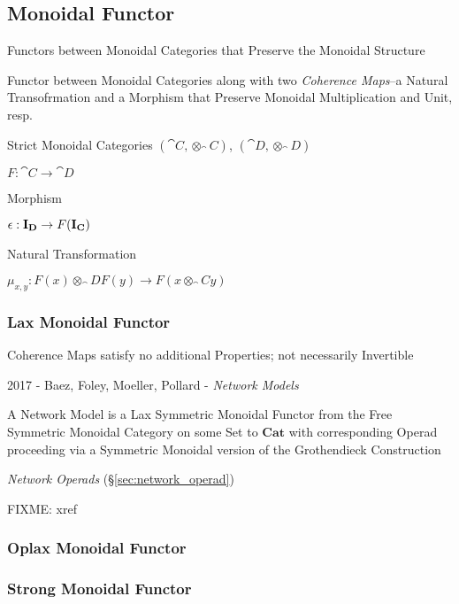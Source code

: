 \subsection{Monoidal Functor}\label{sec:monoidal_functor}

Functors between Monoidal Categories that Preserve the Monoidal
Structure

Functor between Monoidal Categories along with two \emph{Coherence
  Maps}--a Natural Transofrmation and a Morphism that Preserve
Monoidal Multiplication and Unit, resp.

Strict Monoidal Categories $(\cat{C},\otimes_\cat{C})$,
$(\cat{D},\otimes_\cat{D})$

$F : \cat{C} \rightarrow \cat{D}$

Morphism

$\epsilon : \mathbf{I}_\mathbf{D} \rightarrow F(\mathbf{I}_\mathbf{C})$

Natural Transformation

$\mu_{x,y} : F(x) \otimes_\cat{D} F(y) \rightarrow F(x \otimes_\cat{C} y)$



\subsubsection{Lax Monoidal Functor}\label{sec:lax_monoidal_functor}

Coherence Maps satisfy no additional Properties; not necessarily
Invertible

2017 - Baez, Foley, Moeller, Pollard - \emph{Network Models}

A Network Model is a Lax Symmetric Monoidal Functor from the Free Symmetric
Monoidal Category on some Set to $\mathbf{Cat}$ with corresponding Operad
proceeding via a Symmetric Monoidal version of the Grothendieck Construction

\emph{Network Operads} (\S\ref{sec:network_operad})

FIXME: xref



\subsubsection{Oplax Monoidal Functor}\label{sec:oplax_monoidal_functor}

\subsubsection{Strong Monoidal Functor}\label{sec:strong_monoidal_functor}

